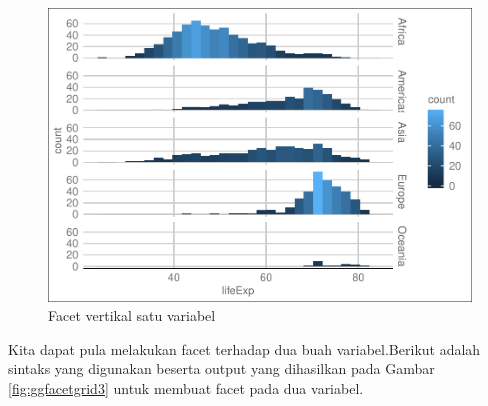 \documentclass[]{book}
\newenvironment{Shaded}{\begin{snugshade}}{\end{snugshade}}
\newcommand{\KeywordTok}[1]{\textcolor[rgb]{0.13,0.29,0.53}{\textbf{#1}}}
\newcommand{\DataTypeTok}[1]{\textcolor[rgb]{0.13,0.29,0.53}{#1}}
\newcommand{\DecValTok}[1]{\textcolor[rgb]{0.00,0.00,0.81}{#1}}
\newcommand{\StringTok}[1]{\textcolor[rgb]{0.31,0.60,0.02}{#1}}
\newcommand{\OperatorTok}[1]{\textcolor[rgb]{0.81,0.36,0.00}{\textbf{#1}}}
\newcommand{\NormalTok}[1]{#1}
\begin{document}
\begin{figure}

{\centering \includegraphics[width=0.8\linewidth]{EnvStat_files/figure-latex/ggfacetgrid2-1} 

}

\caption{Facet vertikal satu variabel}\label{fig:ggfacetgrid2}
\end{figure}

Kita dapat pula melakukan facet terhadap dua buah variabel.Berikut
adalah sintaks yang digunakan beserta output yang dihasilkan pada Gambar
\ref{fig:ggfacetgrid3} untuk membuat facet pada dua variabel.

\begin{Shaded}
\end{Shaded}
\end{document}
